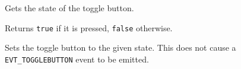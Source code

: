 \label{wxtogglebuttongetvalue}


Gets the state of the toggle button.


Returns {\tt true} if it is pressed, {\tt false} otherwise.

\label{wxtogglebuttonsetvalue}


Sets the toggle button to the given state. This does not cause a 
{\tt EVT\_TOGGLEBUTTON} event to be emitted.



